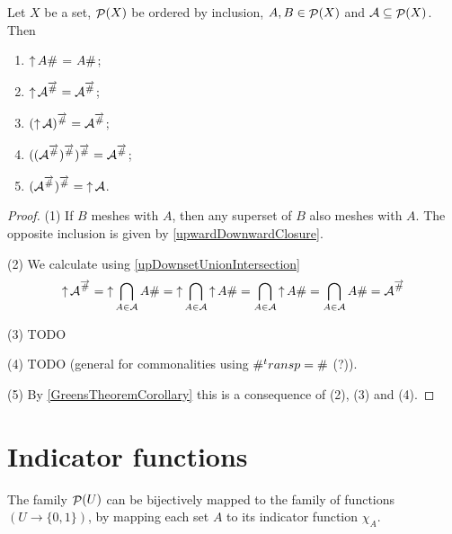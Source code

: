 \begin{lemma}
Let $X$ be a set, $\mathop{\mathcal{P}}(X)$ be ordered by inclusion, $A, B\in \mathop{\mathcal{P}}(X)$ and $\mathcal{A} \subseteq \mathop{\mathcal{P}}(X)$. Then
\begin{enumerate}
\item $\mathop{\uparrow} A\mathbin{\#}$ = $A\mathbin{\#}$;
\item $\mathop{\uparrow} \mathcal{A}^{\overrightarrow{\mathbin{\#}}} = \mathcal{A}^{\overrightarrow{\mathbin{\#}}}$;
\item $(\mathop{\uparrow} \mathcal{A})^{\overrightarrow{\mathbin{\#}}} = \mathcal{A}^{\overrightarrow{\mathbin{\#}}}$;
\item $((\mathcal{A}^{\overrightarrow{\mathbin{\#}}})^{\overrightarrow{\mathbin{\#}}})^{\overrightarrow{\mathbin{\#}}} = \mathcal{A}^{\overrightarrow{\mathbin{\#}}}$;
\item $(\mathcal{A}^{\overrightarrow{\mathbin{\#}}})^{\overrightarrow{\mathbin{\#}}} = \mathop{\uparrow} \mathcal{A}$.
\end{enumerate}
\end{lemma}
\begin{proof}
(1) If $B$ meshes with $A$, then any superset of $B$ also meshes with $A$. The opposite inclusion is given by \ref{upwardDownwardClosure}.

(2) We calculate using \ref{upDownsetUnionIntersection}
\[ \mathop{\uparrow} \mathcal{A}^{\overrightarrow{\mathbin{\#}}} = \mathop{\uparrow} \bigcap_{A\in\mathcal{A}} A\mathbin{\#} = \mathop{\uparrow} \bigcap_{A\in\mathcal{A}} \mathop{\uparrow} A\mathbin{\#} = \bigcap_{A\in\mathcal{A}} \mathop{\uparrow} A\mathbin{\#} = \bigcap_{A\in\mathcal{A}} A\mathbin{\#} = \mathcal{A}^{\overrightarrow{\mathbin{\#}}} \]

(3) TODO

(4) TODO (general for commonalities using $\mathbin{\#}^transp = \mathbin{\#}$ (?)).

(5) By \ref{GreensTheoremCorollary} this is a consequence of (2), (3) and (4).
\end{proof}

\section{Indicator functions}
The family $\mathop{\mathcal{P}}(U)$ can be bijectively mapped to the family of functions $(U\to \{0,1\})$, by mapping each set $A$ to its indicator function $\chi_A$.


